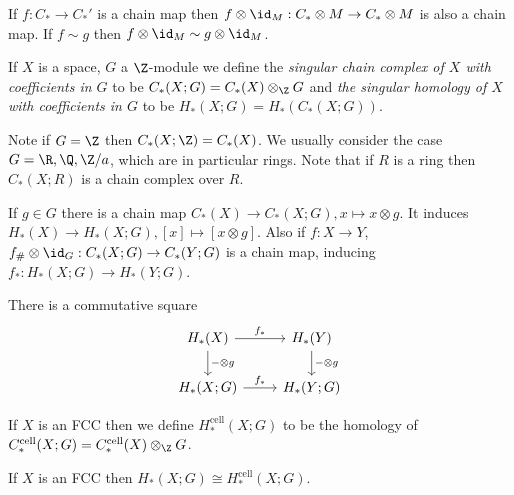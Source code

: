 \documentclass[a4paper]{article}
\newcommand{\cell}{\mathrm{cell}}
\begin{document}
\begin{lemma}
  If \(f: C _* \to C_*'\) is a chain map then \(f \otimes \id_M: C_* \otimes M \to C_* \otimes M\) is also a chain map. If \(f \sim g\) then \(f \otimes \id_M \sim g \otimes \id_M\).
\end{lemma}

\begin{definition}
  If \(X\) is a space, \(G\) a \(\Z\)-module we define the \emph{singular chain complex of \(X\) with coefficients in \(G\)} to be \(C_*(X; G) = C_*(X) \otimes_\Z G\) and \emph{the singular homology of \(X\) with coefficients in \(G\)} to be \(H_*(X; G) = H_*(C_*(X; G))\).
\end{definition}

Note if \(G = \Z\) then \(C_*(X; \Z) = C_*(X)\). We usually consider the case \(G = \R, \Q, \Z/a\), which are in particular rings. Note that if \(R\) is a ring then \(C_*(X; R)\) is a chain complex over \(R\).

If \(g \in G\) there is a chain map \(C_*(X) \to C_*(X; G), x \mapsto x \otimes g\). It induces \(H_*(X) \to H_*(X; G), [x] \mapsto [x \otimes g]\). Also if \(f: X \to Y\), \(f_\# \otimes \id_G: C_*(X; G) \to C_*(Y; G)\) is a chain map, inducing \(f_*: H_*(X; G) \to H_*(Y; G)\).

\begin{lemma}
  There is a commutative square
  \[
    \begin{tikzcd}
      H_*(X) \ar[r, "f_*"] \ar[d, "- \otimes g"] & H_*(Y) \ar[d, "- \otimes g"] \\
      H_*(X; G) \ar[r, "f_*"] & H_*(Y; G)
    \end{tikzcd}
  \]
\end{lemma}

If \(X\) is an FCC then we define \(H_*^\cell(X; G)\) to be the homology of \(C_*^\cell(X; G) = C_*^\cell(X) \otimes_\Z G\).

\begin{theorem}
  If \(X\) is an FCC then \(H_*(X; G) \cong H_*^\cell(X; G)\).
\end{theorem}
\end{document}

